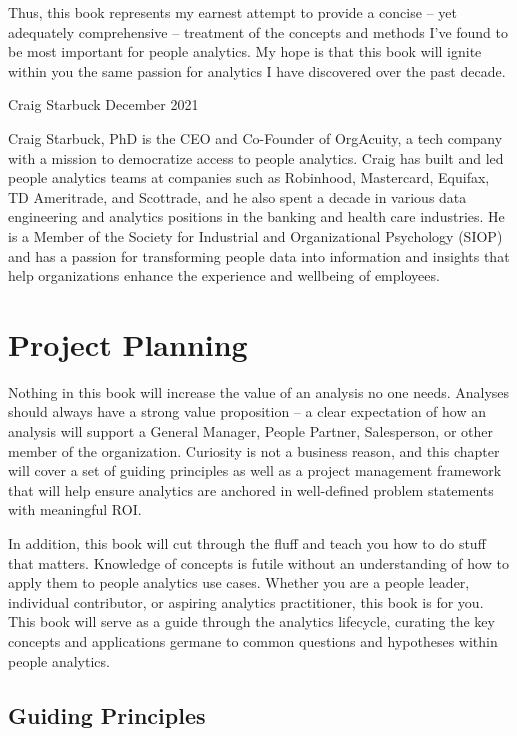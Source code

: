\documentclass[]{book}
\begin{document}
Thus, this book represents my earnest attempt to provide a concise -- yet adequately comprehensive -- treatment of the concepts and methods I've found to be most important for people analytics. My hope is that this book will ignite within you the same passion for analytics I have discovered over the past decade.

Craig Starbuck
December 2021

Craig Starbuck, PhD is the CEO and Co-Founder of OrgAcuity, a tech company with a mission to democratize access to people analytics. Craig has built and led people analytics teams at companies such as Robinhood, Mastercard, Equifax, TD Ameritrade, and Scottrade, and he also spent a decade in various data engineering and analytics positions in the banking and health care industries. He is a Member of the Society for Industrial and Organizational Psychology (SIOP) and has a passion for transforming people data into information and insights that help organizations enhance the experience and wellbeing of employees.

\hypertarget{planning}{%
\chapter{Project Planning}\label{planning}}

Nothing in this book will increase the value of an analysis no one needs. Analyses should always have a strong value proposition -- a clear expectation of how an analysis will support a General Manager, People Partner, Salesperson, or other member of the organization. Curiosity is not a business reason, and this chapter will cover a set of guiding principles as well as a project management framework that will help ensure analytics are anchored in well-defined problem statements with meaningful ROI.

In addition, this book will cut through the fluff and teach you how to do stuff that matters. Knowledge of concepts is futile without an understanding of how to apply them to people analytics use cases. Whether you are a people leader, individual contributor, or aspiring analytics practitioner, this book is for you. This book will serve as a guide through the analytics lifecycle, curating the key concepts and applications germane to common questions and hypotheses within people analytics.

\hypertarget{guiding-principles}{%
\section{Guiding Principles}\label{guiding-principles}}
\end{document}
